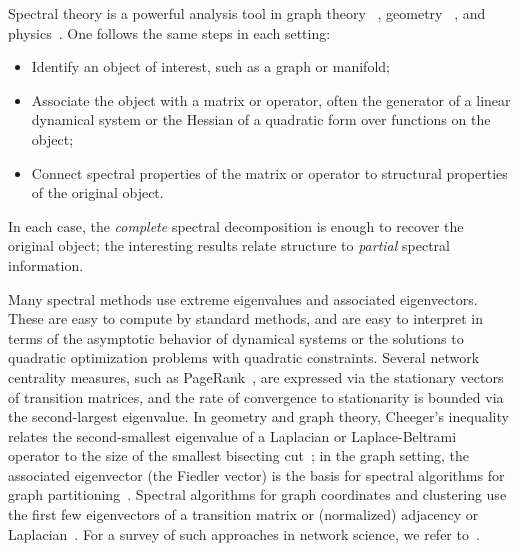 Spectral theory is a powerful analysis tool in graph theory~
\cite{ctekovic1998spectra,chung1997spectral,chung2006complex}, geometry~
\cite{chavel1984eigenvalues}, and physics~\cite{jackson2006math}. One follows
the same steps in each setting:
\begin{itemize}
	\item Identify an object of interest, such as a graph or manifold;
	\item Associate the object with a matrix or operator, often the generator
  of a linear dynamical system or the Hessian of a quadratic form over
  functions on the object;
	\item Connect spectral properties of the matrix or operator to
  structural properties of the original object.
\end{itemize}
In each case, the {\em complete} spectral decomposition is enough to
recover the original object; the interesting results relate structure
to {\em partial} spectral information.

Many spectral methods use extreme eigenvalues and associated eigenvectors. 
These are easy to compute by standard methods, and are easy to interpret in
terms of the asymptotic behavior of dynamical systems or the solutions to
quadratic optimization problems with quadratic constraints.  Several network
centrality measures, such as PageRank~\cite{page1999pagerank}, are expressed via
the stationary vectors of transition matrices, and the rate of convergence to
stationarity is bounded via the second-largest eigenvalue.  In geometry and
graph theory, Cheeger's inequality relates the second-smallest eigenvalue of a
Laplacian or Laplace-Beltrami operator to the size of the smallest bisecting
cut~\cite{cheeger1969lower,mohar1989isoperimetric}; in the graph setting, the
associated eigenvector (the Fiedler vector) is the basis for spectral algorithms
for graph partitioning~\cite{pothen1990partitioning}.  Spectral algorithms for
graph coordinates and clustering use the first few eigenvectors of a transition
matrix or (normalized) adjacency or Laplacian~\cite{belkin2001laplacian,
ng2002spectral}. For a survey of such approaches in network science, we refer
to~\cite{chung2006complex}.

